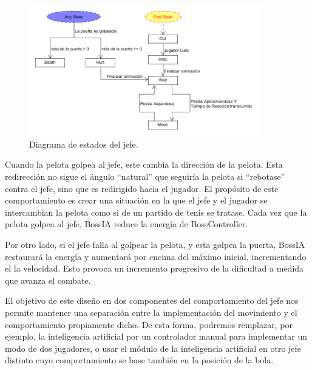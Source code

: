 \begin{figure}[h]
	\includegraphics[width=0.9\textwidth]{images/estructura/jefe/boss-estados}
	\centering
	\caption{Diagrama de estados del jefe.}
\end{figure}

Cuando la pelota golpea al jefe, este cambia la dirección de la pelota. Esta redirección no sigue el ángulo ``natural'' que seguiría la pelota si ``rebotase'' contra el jefe, sino que es redirigido hacia el jugador. El propósito de este comportamiento es crear una situación en la que el jefe y el jugador se intercambian la pelota como si de un partido de tenis se tratase. Cada vez que la pelota golpea al jefe, BossIA reduce la energía de BossController. 

Por otro lado, si el jefe falla al golpear la pelota, y esta golpea la puerta, BossIA restaurará la energía y aumentará por encima del máximo inicial, incrementando el la velocidad. Esto provoca un incremento progresivo de la dificultad a medida que avanza el combate.

El objetivo de este diseño en dos componentes del comportamiento del jefe nos permite mantener una separación entre la implementación del movimiento y el comportamiento propiamente dicho. De esta forma, podremos remplazar, por ejemplo, la inteligencia artificial por un controlador manual para implementar un modo de dos jugadores, o usar el módulo de la inteligencia artificial en otro jefe distinto cuyo comportamiento se base también en la posición de la bola.
